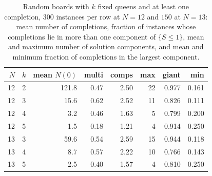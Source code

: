 \begin{table}[t]
\centering
\small
\caption{Random boards with $k$ fixed queens and at least one completion, $300$ instances per row at $N = 12$ and $150$ at $N = 13$: mean number of completions, fraction of instances whose completions lie in more than one component of $\{ S \le 1 \}$, mean and maximum number of solution components, and mean and minimum fraction of completions in the largest component.}
\label{tab:random2}
\footnotesize
\begin{tabular}{rrrrrrrr}
\toprule
$N$ & $k$ & mean $N(0)$ & multi & comps & max & giant & min \\
\midrule
12 & 2 & 121.8 & 0.47 & 2.50 & 22 & 0.977 & 0.161 \\
12 & 3 & 15.6 & 0.62 & 2.52 & 11 & 0.826 & 0.111 \\
12 & 4 & 3.2 & 0.46 & 1.63 & 5 & 0.799 & 0.200 \\
12 & 5 & 1.5 & 0.18 & 1.21 & 4 & 0.914 & 0.250 \\
13 & 3 & 59.6 & 0.54 & 2.59 & 15 & 0.944 & 0.118 \\
13 & 4 & 8.7 & 0.57 & 2.22 & 10 & 0.766 & 0.143 \\
13 & 5 & 2.5 & 0.40 & 1.57 & 4 & 0.810 & 0.250 \\
\bottomrule
\end{tabular}
\end{table}

